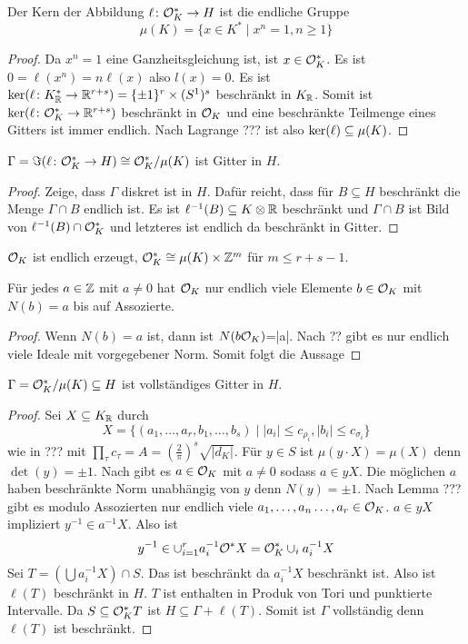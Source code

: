 \begin{Lemma}
Der Kern der Abbildung \(\ell\colon \mathcal{O}_K^*\to H\) ist die endliche Gruppe 
\[\mu(K)=\{x\in K^*\mid x^n=1, n\geq 1\}\]
\end{Lemma}
\begin{proof}
Da \(x^n=1\) eine Ganzheitsgleichung ist, ist \(x\in\mathcal{O}^*_K\).
Es ist \(0=\ell(x^n)=n\ell(x)\) also \(l(x)=0\).
Es ist \(\ker(\ell\colon K^*_{\mathbb{R}}\to \mathbb{R}^{r+s})=\{\pm 1\}^r\times (S^1)^s\) beschränkt in \(K_{\mathbb{R}}\).
Somit ist \(\ker(\ell\colon \mathcal{O}_K^*\to \mathbb{R}^{r+s})\) beschränkt in \(\mathcal{O}_K\) und eine beschränkte Teilmenge eines Gitters ist immer endlich.
Nach Lagrange ??? ist also \(\operatorname{ker}(\ell)\subseteq \mu(K)\).
\end{proof}
\begin{Lemma}
\(\Gamma=\Im(\ell\colon \mathcal{O}_K^*\to H)\cong \mathcal{O}_K^*/\mu(K)\) ist Gitter in \(H\).
\end{Lemma}
\begin{proof}
Zeige, dass \(\Gamma\) diskret ist in \(H\).
Dafür reicht, dass für \(B\subseteq H\) beschränkt die Menge \(\Gamma\cap B\) endlich ist.
Es ist \(\ell^{-1}(B)\subseteq K\otimes \mathbb{R}\) beschränkt und \(\Gamma\cap B\) ist Bild von \(\ell^{-1}(B)\cap \mathcal{O}_K^*\) und letzteres ist endlich da beschränkt in Gitter.
\end{proof}
\begin{Kor} \(\mathcal{O}_K\) ist endlich erzeugt, \(\mathcal{O}_K^*\cong \mu(K)\times \mathbb{Z}^m\) für \(m\leq r+s-1\).
\end{Kor}
\begin{Lemma}
	Für jedes \(a\in\mathbb{Z}\) mit \(a\neq 0\) hat \(\mathcal{O}_K\) nur endlich viele Elemente \(b\in\mathcal{O}_K\) mit \(N(b)=a\) bis auf Assozierte.
\end{Lemma}
\begin{proof}
	Wenn \(N(b)=a\) ist, dann ist \(N(b\mathcal{O}_K)\)=|a|. Nach ??
	gibt es nur endlich viele Ideale mit vorgegebener Norm. 
	Somit folgt die Aussage
\end{proof}
\begin{Satz}
	\(\Gamma=\mathcal{O}_K^*/\mu(K)\subseteq H\) ist vollständiges Gitter in \(H\).
\end{Satz}
\begin{proof}
	Sei \(X\subseteq K_{\mathbb{R}}\) durch
	\[X=\{(a_1,\dots,a_r,b_1,\dots,b_s)\mid |a_i|\leq c_{\rho_i}, |b_i|\leq c_{\sigma_i}\}\] wie in ??? mit 
	\(\prod_\tau c_\tau=A=(\frac 2 \pi)^s\sqrt{|d_K|}\).
	Für \(y\in S\) ist \(\mu(y\cdot X)=\mu(X)\) denn \(\det(y)=\pm 1\).
	Nach  gibt es \(a\in\mathcal{O}_K\) mit \(a\neq 0\) sodass \(a\in yX\).
	Die möglichen \(a\) haben beschränkte Norm unabhängig von \(y\) denn \(N(y)=\pm 1\).
	Nach Lemma ??? gibt es modulo Assozierten nur endlich viele \(a_1,\dots,a_n\dots,a_r\in \mathcal{O}_K\).
	\(a\in yX\) impliziert \(y^{-1}\in a^{-1}X\).
	Also ist
	\[y^{-1}\in\cup_{i=1}^r a_i^{-1}\mathcal{O}^*X=\mathcal{O}_K^*\cup_ia_i^{-1}X\]
	Sei \(T=(\bigcup a_i^{-1}X)\cap S\). Das ist beschränkt da \(a_i^{-1}X\) beschränkt ist.
	Also ist \(\ell(T)\) beschränkt in \(H\).
	\(T\) ist enthalten in Produk von Tori und punktierte Intervalle.
	Da \(S\subseteq \mathcal{O}_K^*T\) ist \(H\subseteq \Gamma+\ell(T)\). Somit ist \(\Gamma\) vollständig denn \(\ell(T)\) ist beschränkt.
\end{proof}
